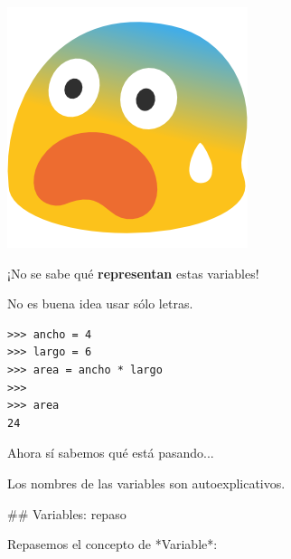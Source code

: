 \pause
\vspace{1ex}
\includegraphics[width=.7\textwidth,valign=t]{img/658-emoji_android_fearful_face.png}

\begin{footnotesize}
    \begin{nzalertblock}
    ¡No se sabe qué \textbf{representan} estas variables!
    \end{nzalertblock}

    \begin{nzalertblock}
    \footnotesize No es buena idea usar sólo letras.
    \end{nzalertblock}
\end{footnotesize}

\trmcolumns


\pause
\vspace{2ex}

\bgncolumns

\begin{lstlisting}
>>> ancho = 4
>>> largo = 6
>>> area = ancho * largo
>>>
>>> area
24
\end{lstlisting}
\pause

\bgnblocknormal
    Ahora sí sabemos qué está pasando...
\trmblocknormal

\bgnblocknormal
    \footnotesize Los nombres de las variables son autoexplicativos.
\trmblocknormal

\trmcolumns

## Variables: repaso

Repasemos el concepto de *Variable*:

\vfill

